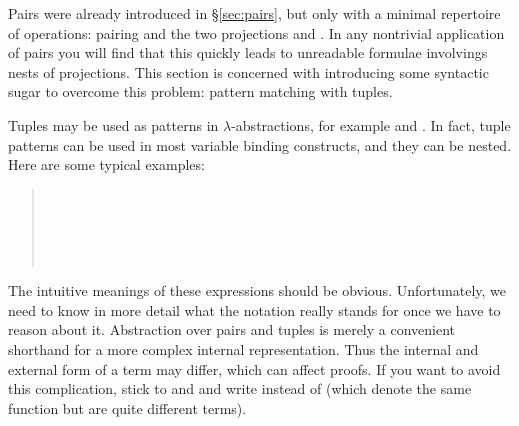 %
\begin{isabellebody}%
\def\isabellecontext{Pairs}%
%
%
\begin{isamarkuptext}%
\label{sec:products}
Pairs were already introduced in \S\ref{sec:pairs}, but only with a minimal
repertoire of operations: pairing and the two projections  and
. In any nontrivial application of pairs you will find that this
quickly leads to unreadable formulae involvings nests of projections. This
section is concerned with introducing some syntactic sugar to overcome this
problem: pattern matching with tuples.%
\end{isamarkuptext}%
%
%
\begin{isamarkuptext}%
Tuples may be used as patterns in $\lambda$-abstractions,
for example  and . In fact,
tuple patterns can be used in most variable binding constructs,
and they can be nested. Here are
some typical examples:
\begin{quote}
\\
\\
\\
\\
\end{quote}%
\end{isamarkuptext}%
%
\begin{isamarkuptext}%
The intuitive meanings of these expressions should be obvious.
Unfortunately, we need to know in more detail what the notation really stands
for once we have to reason about it.  Abstraction
over pairs and tuples is merely a convenient shorthand for a more complex
internal representation.  Thus the internal and external form of a term may
differ, which can affect proofs. If you want to avoid this complication,
stick to  and  and write 
instead of  (which denote the same function but are quite
different terms).


\end{isamarkuptext}
\end{isabellebody}
